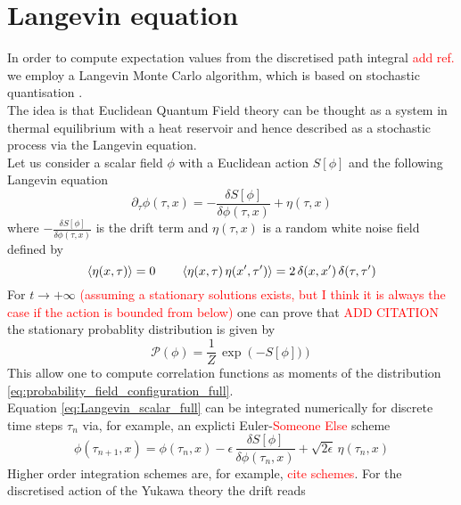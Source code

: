 \section{Langevin equation}
In order to compute expectation values from the discretised path integral \textcolor{red}{add ref.} we employ a Langevin Monte Carlo algorithm, which is based on stochastic quantisation \cite{ParisiWu, Damgaard1987StochasticQuantization}. \\
The idea is that Euclidean Quantum Field theory can be thought as a system in thermal equilibrium with a heat reservoir and hence described as a stochastic process via the Langevin equation. \\
Let us consider a scalar field $\phi$ with a Euclidean action $S[\phi]$ and the following Langevin equation
\begin{equation}
    \partial_\tau \phi(\tau, x) = - \frac{\delta S[\phi]}{\delta \phi (\tau, x)} + \eta (\tau, x)
    \label{eq:Langevin_scalar_full}
\end{equation}
where $- \frac{\delta S[\phi]}{\delta \phi (\tau, x)}$ is the drift term and $\eta (\tau, x)$ is a random white noise field defined by
\begin{equation*}
    \left\langle \eta(x,\tau) \right\rangle = 0 \qquad \left\langle \eta(x,\tau) \, \eta(x',\tau') \right\rangle = 2 \, \delta(x, x') \, \delta (\tau, \tau')
\end{equation*}
For $t \to +\infty$ \textcolor{red}{(assuming a stationary solutions exists, but I think it is always the case if the action is bounded from below)} one can prove that \textcolor{red}{ADD CITATION} the stationary probablity distribution is given by
\begin{equation}
    \mathcal{P}(\phi) = \frac{1}{Z} \, \exp\left(-S[\phi])\right)
    \label{eq:probability_field_configuration_full}
\end{equation}
This allow one to compute correlation functions as moments of the distribution \eqref{eq:probability_field_configuration_full}. \\
Equation \ref{eq:Langevin_scalar_full} can be integrated numerically for discrete time steps $\tau_n$ via, for example, an explicti Euler-\textcolor{red}{Someone Else} scheme
\begin{equation*}
    \phi(\tau_{n+1}, x) = \phi(\tau_{n}, x) - \epsilon \,  \frac{\delta S[\phi]}{\delta \phi (\tau_n, x)} + \sqrt{2\epsilon} \, \eta(\tau_n, x)
\end{equation*}
Higher order integration schemes are, for example, \textcolor{red}{cite schemes}.
For the discretised action of the Yukawa theory the drift reads
